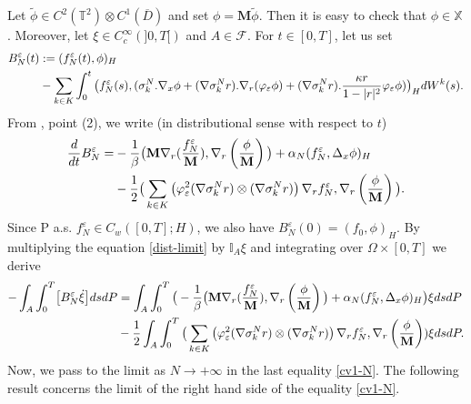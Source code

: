 \documentclass[a4paper,12pt, reqno]{amsart}
\newcommand{\T}{\mathbb{T}}
\begin{document}
   Let $\widetilde{\phi}\in C^2(\T^2)\otimes C^1(\overline{D})$ and set $\phi=\mathbf{M}\widetilde{\phi}.$ Then it is easy to check that $\phi   \in \mathbb{X}$. Moreover,      let    $\xi\in  C^\infty_c(]0,T[)$ and $A\in \mathcal{F}$.
   For  $t\in [0,T]$, let us  set 
        \begin{align}\label{time-regu}
            B_N^\varepsilon(t) &:=(f_N^\varepsilon(t), \phi )_H \\& -\sum_{k\in K}\int_0^t\big(f_N^\varepsilon(s),( \sigma_k^N.\nabla_x\phi +(\nabla \sigma_k^Nr).\nabla_r (\varphi_\varepsilon\phi)+(\nabla \sigma_k^Nr).\dfrac{\kappa r}{1-\vert r\vert^2}\varphi_\varepsilon\phi)\big)_HdW^k(s).\notag
        \end{align}
		From    , point (2),   we  write   (in distributional sense    with    respect to  $t$)
	\begin{align}\dfrac{d}{dt}B_N^\varepsilon=&-\dfrac{1}{\beta}\big(\mathbf{M}\nabla_r(\dfrac{f^\varepsilon_N}{\mathbf{M}}),\nabla_r\left(\dfrac{\phi}{\mathbf{M}}\right)\big)+\alpha_N(f_N^\varepsilon ,\Delta_x\phi )_H \notag\\&- \dfrac{1}{2}\big(\sum_{k\in K}\left(\varphi_\varepsilon^2(\nabla \sigma_k^Nr) \otimes (\nabla \sigma_k^Nr)\right) \nabla_rf^\varepsilon_N,\nabla_r\left(\dfrac{\phi}{\mathbf{M}}\right)\big).\label{dist-limit}\end{align}
Since  P a.s.  $f^\varepsilon_N \in C_w([0, T];H)$, we also have $B_N^\varepsilon(0) =(f_0, \phi)_H.$
By multiplying the      equation \eqref{dist-limit}    by    $\mathbb{I}_A\xi$ and integrating  over $\Omega \times [0,T]$ we derive 
	\begin{align}
		-\int_A\int_0^T\bigl[B_N^\varepsilon\dot\xi \bigr]dsdP&=\int_A\int_0^T\big(-\dfrac{1}{\beta}\big(\mathbf{M}\nabla_r(\dfrac{f^\varepsilon_N}{\mathbf{M}}),\nabla_r\left(\dfrac{\phi}{\mathbf{M}}\right)\big)+\alpha_N(f_N^\varepsilon ,\Delta_x\phi )_H \big) \xi dsdP \label{cv1-N}\\&-\dfrac{1}{2}\int_A\int_0^T\big(\sum_{k\in K}\left(\varphi_\varepsilon^2(\nabla \sigma_k^Nr) \otimes (\nabla \sigma_k^Nr)\right) \nabla_rf^\varepsilon_N,\nabla_r\left(\dfrac{\phi}{\mathbf{M}}\right))\xi dsdP.	\notag\end{align}
        Now, we pass to the limit as $N\to +\infty$ in the last equality \eqref{cv1-N}. The following result concerns the limit of the right hand side of the equality \eqref{cv1-N}.
\end{document}
